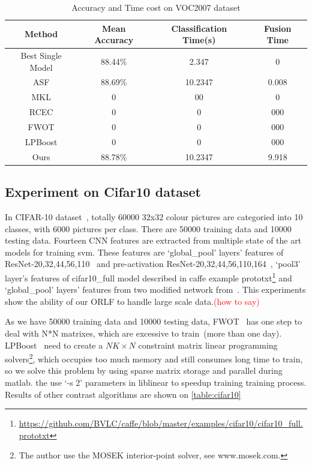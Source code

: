 \documentclass[letterpaper]{article}
\def\yanred{\textcolor{red}}
\begin{document}
\begin{table}[!h]\scriptsize
\centering
\label{table:voc}
\begin{tabular}{c|c|c|c}
\hline
Method            & Mean Accuracy & Classification Time(s)& Fusion Time \\\hline
Best Single Model & 88.44\%       &  2.347                &      0    \\\hline
ASF               & 88.69\%       &  10.2347              &    0.008   \\ %
MKL               &     0 & 00 & 0 \\
RCEC              &     0 & 0 & 000 \\
FWOT              &     0 & 0 & 000 \\
LPBoost           &     0 & 0 & 000 \\\hline
Ours              & 88.78\%       & 10.2347               & 9.918 \\
\hline
\end{tabular}
\caption{Accuracy and Time cost on VOC2007 dataset}
\end{table}
\fi

\subsection{Experiment on Cifar10 dataset}
In CIFAR-10 dataset~\cite{krizhevsky2009learning}, totally 60000 32x32 colour pictures are categoried into 10 classes, with 6000 pictures per class. There are 50000 training data and 10000 testing data. Fourteen CNN features are extracted from multiple state of the art models for training svm. These features are `global\_pool' layers' features of ResNet-20,32,44,56,110~\cite{he2015deep} and pre-activation ResNet-20,32,44,56,110,164~\cite{he2016identity},  `pool3' layer's features of cifar10\_full model described in caffe example prototxt\footnote{\url{https://github.com/BVLC/caffe/blob/master/examples/cifar10/cifar10_full.prototxt}} and `global\_pool' layers' features from two modified network from~\cite{szegedy2015going,chatfield2014return}. This experiments show the ability of our ORLF to handle large scale data.\yanred{(how to say)}

As we have 50000 training data and 10000 testing data, FWOT~\cite{xuiccv2013feature} has one step to deal with N*N matrixes, which are excessive to train~(more than one day). LPBoost~\cite{gehler2009feature} need to create a $NK\times N$ constraint matrix linear programming solvers\footnote{The author use the MOSEK interior-point solver, see www.mosek.com.}, which occupies too much memory and still consumes long time to train, so we solve this problem by using sparse matrix storage and parallel during matlab. the use `-s 2' parameters in liblinear to speedup training training process. Results of other contrast algorithms are shown on \ref{table:cifar10}
\end{document}
